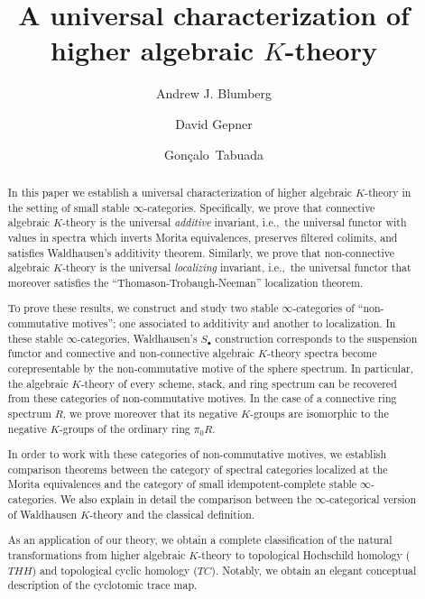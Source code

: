 \documentclass{amsart}
\newcommand{\ssdot}{\bullet}%
\newcommand{\Sdot}[1][\ssdot]{S_{#1}}
\newcommand{\ie}{{i.e.,}\ }
\renewcommand{\i}{\infty}
\numberwithin{equation}{section}
\theoremstyle{definition}
\begin{document}
\title[A universal characterization of higher algebraic $K$-theory]{A universal characterization of \\higher algebraic $K$-theory}

\author{Andrew J. Blumberg}
  \address{Department of Mathematics, University of Texas,
Austin, TX \ 78703, USA}
\author{David Gepner}
\address{Fakult\"at f\"ur Mathematik,
Universit\"at Regensburg, 93040 Regensburg, Germany}
\author{Gon{\c c}alo~Tabuada}
\address{Gon{\c c}alo Tabuada, Department of Mathematics, MIT, Cambridge, MA 02139, USA and Departamento de Matem{\'a}tica e CMA, FCT-UNL, Quinta da Torre, 2829-516, Caparica, Portugal}

\begin{abstract}
In this paper we establish a universal characterization of higher
algebraic $K$-theory in the setting of small stable $\i$-categories.
Specifically, we prove that connective algebraic $K$-theory is the
universal {\em additive} invariant, \ie the universal functor with
values in spectra which inverts Morita equivalences, preserves
filtered colimits, and satisfies Waldhausen's additivity theorem.
Similarly, we prove that non-connective algebraic $K$-theory is the
universal {\em localizing} invariant, \ie the universal functor that
moreover satisfies the ``Thomason-Trobaugh-Neeman'' localization
theorem.

To prove these results, we construct and study two stable
$\i$-categories of ``non-commutative motives''; one associated to
additivity and another to localization.  In these stable
$\i$-categories, Waldhausen's $\Sdot$ construction corresponds to the
suspension functor and connective and non-connective algebraic
$K$-theory spectra become corepresentable by
the non-commutative motive of the sphere spectrum. In
particular, the algebraic $K$-theory of every scheme, stack, and ring
spectrum can be recovered from these categories of non-commutative
motives. In the case of a connective ring spectrum $R$, we
prove moreover that its negative $K$-groups are isomorphic to the negative $K$-groups of the ordinary ring $\pi_0R$.

In order to work with these categories of non-commutative motives, we
establish comparison theorems between the category of spectral
categories localized at the Morita equivalences and the category
of small idempotent-complete stable $\i$-categories.  We also explain
in detail the comparison between the $\i$-categorical version of
Waldhausen $K$-theory and the classical definition.

As an application of our theory, we obtain a complete classification
of the natural transformations from higher algebraic $K$-theory to
topological Hochschild homology ($THH$) and topological cyclic
homology ($TC$).  Notably, we obtain an elegant conceptual description
of the cyclotomic trace map.
\end{abstract}
\end{document}
